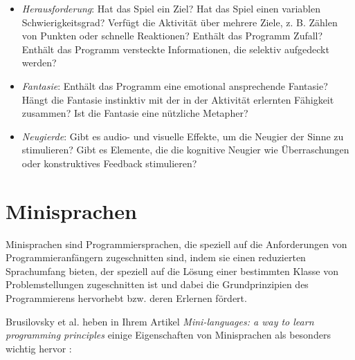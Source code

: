 \begin{itemize}
    \item \emph{Herausforderung}: Hat das Spiel ein Ziel? Hat das Spiel einen variablen Schwierigkeitsgrad? Verfügt die Aktivität über mehrere Ziele, z. B. Zählen von Punkten oder schnelle Reaktionen? Enthält das Programm Zufall? Enthält das Programm versteckte Informationen, die selektiv aufgedeckt werden?
    \item \emph{Fantasie}: Enthält das Programm eine emotional ansprechende Fantasie? Hängt die Fantasie instinktiv mit der in der Aktivität erlernten Fähigkeit zusammen? Ist die Fantasie eine nützliche Metapher?
    \item \emph{Neugierde}: Gibt es audio- und visuelle Effekte, um die Neugier der Sinne zu stimulieren? Gibt es Elemente, die die kognitive Neugier wie Überraschungen oder konstruktives Feedback stimulieren?
\end{itemize}


\section{Minisprachen}
\label{sec:basics:mini-languages}

Minisprachen sind Programmiersprachen, die speziell auf die Anforderungen von Programmieranfängern zugeschnitten sind, indem sie einen reduzierten Sprachumfang bieten, der speziell auf die Lösung einer bestimmten Klasse von Problemstellungen zugeschnitten ist und dabei die Grundprinzipien des Programmierens hervorhebt bzw. deren Erlernen fördert.

Brusilovsky et al. heben in Ihrem Artikel \textit{Mini-languages: a way to learn programming principles} einige Eigenschaften von Minisprachen als besonders wichtig hervor \cite[73-74]{brusilovsky1997}:

